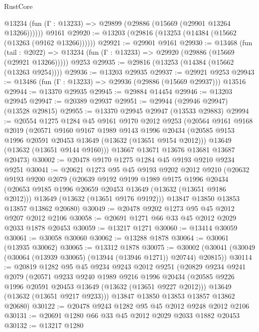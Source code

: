 \begin{lexlean}{RustCore}
\begin{coremodule}
      @13234 (fun (Γ : @13233) => @29899 (@29886 (@15669 (@29901 @13264 @13266))))))
    @9161
@29920 := @13203 (@29816 (@13253 (@14384 (@15662 (@13263 (@9162 @13266))))))
@29921 := @29901 @9161
@29930 := @13468
    (fun (tail : @2022) => @13234 (fun (Γ : @13233) => @29920 (@29886 (@15669 (@29921 @13266)))))
    @9253
@29935 := @29816 (@13253 (@14384 (@15662 (@13263 @9254))))
@29936 := @13203 @29935
@29937 := @29921 @9253
@29943 := @13486 (fun (Γ : @13233) => @29936 (@29886 (@15669 @29937))) @13516
@29944 := @13370 @29935
@29945 := @29884 @14454
@29946 := @13203 @29945
@29947 := @20389 @29937
@29951 := @29944 (@29946 @29947) (@13528 @29815)
@29955 := @13370 @29945 @29947 (@13533 @29883)
@29994 := @20554
    @1275
    @1284
    @45
    @9161
    @9170
    @2012
    @9253
    (@20564
      @9161
      @9168
      @2019
      (@20571
        @9160
        @9167
        @1989
        @9143
        @1996
        @20434
        (@20585 @9153 @1996 @20591 @20453 @13649 (@13632 (@13651 @9154 @2012)))
        @13649
        (@13632 (@13651 @9144 @9160)))
      @13667
      @13671
      @13676
      @13681
      @13687
      @20473)
@30002 := @20478 @9170 @1275 @1284 @45 @9193 @9210 @9234 @9251
@30041 := @20621
    @1273
    @95
    @45
    @9193
    @9202
    @2012
    @9210
    (@20632
      @9193
      @9200
      @2079
      (@20639
        @9192
        @9199
        @1989
        @9175
        @1996
        @20434
        (@20653 @9185 @1996 @20659 @20453 @13649 (@13632 (@13651 @9186 @2012)))
        @13649
        (@13632 (@13651 @9176 @9192)))
      @13847
      @13850
      @13853
      @13857
      @13862
      @20680)
@30049 := @20478 @9202 @1273 @95 @45 @2012 @9207 @2012 @2106
@30058 := @20691 @1271 @66 @33 @45 @2012 @2029 @2033 @1878 @20453
@30059 := @13217 @1271
@30060 := @13414 @30059
@30061 := @30058 @30060
@30062 := @13288 @1878
@30064 := @30061 (@13935 @30062)
@30065 := @13312 @1878
@30075 := @30002 (@30041 (@30049 (@30064 (@13939 @30065) (@13944 (@13946 @1271)) @20744) @20815))
@30114 := @20819
    @1282
    @95
    @45
    @9234
    @9243
    @2012
    @9251
    (@20829
      @9234
      @9241
      @2079
      (@20571
        @9233
        @9240
        @1989
        @9216
        @1996
        @20434
        (@20585 @9226 @1996 @20591 @20453 @13649 (@13632 (@13651 @9227 @2012)))
        @13649
        (@13632 (@13651 @9217 @9233)))
      @13847
      @13850
      @13853
      @13857
      @13862
      @20680)
@30122 := @20478 @9243 @1282 @95 @45 @2012 @9248 @2012 @2106
@30131 := @20691 @1280 @66 @33 @45 @2012 @2029 @2033 @1882 @20453
@30132 := @13217 @1280

\end{coremodule}
\end{lexlean}
